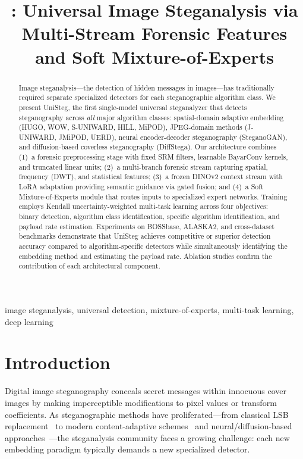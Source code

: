 \documentclass[conference]{IEEEtran}
\title{\method{}: Universal Image Steganalysis via\\Multi-Stream Forensic Features and Soft Mixture-of-Experts}
\author{
\IEEEauthorblockN{Anonymous Author(s)}
\IEEEauthorblockA{Anonymous Institution}
}
\newcommand{\method}{UniSteg}
\begin{document}
\maketitle

\begin{abstract}
Image steganalysis---the detection of hidden messages in images---has traditionally required separate specialized detectors for each steganographic algorithm class.
We present \method{}, the first single-model universal steganalyzer that detects steganography across \emph{all} major algorithm classes: spatial-domain adaptive embedding (HUGO, WOW, S-UNIWARD, HILL, MiPOD), JPEG-domain methods (J-UNIWARD, JMiPOD, UERD), neural encoder-decoder steganography (SteganoGAN), and diffusion-based coverless steganography (DiffStega).
Our architecture combines (1)~a forensic preprocessing stage with fixed SRM filters, learnable BayarConv kernels, and truncated linear units;
(2)~a multi-branch forensic stream capturing spatial, frequency (DWT), and statistical features;
(3)~a frozen DINOv2 context stream with LoRA adaptation providing semantic guidance via gated fusion; and
(4)~a Soft Mixture-of-Experts module that routes inputs to specialized expert networks.
Training employs Kendall uncertainty-weighted multi-task learning across four objectives: binary detection, algorithm class identification, specific algorithm identification, and payload rate estimation.
Experiments on BOSSbase, ALASKA2, and cross-dataset benchmarks demonstrate that \method{} achieves competitive or superior detection accuracy compared to algorithm-specific detectors while simultaneously identifying the embedding method and estimating the payload rate.
Ablation studies confirm the contribution of each architectural component.
\end{abstract}

\begin{IEEEkeywords}
image steganalysis, universal detection, mixture-of-experts, multi-task learning, deep learning
\end{IEEEkeywords}

\section{Introduction}
\label{sec:intro}

Digital image steganography conceals secret messages within innocuous cover images by making imperceptible modifications to pixel values or transform coefficients.
As steganographic methods have proliferated---from classical LSB replacement~\cite{westfeld1999attacks} to modern content-adaptive schemes~\cite{holub2014uniward,sedighi2016mipod} and neural/diffusion-based approaches~\cite{zhu2018hidden,wei2024diffstega}---the steganalysis community faces a growing challenge: each new embedding paradigm typically demands a new specialized detector.
\end{document}
